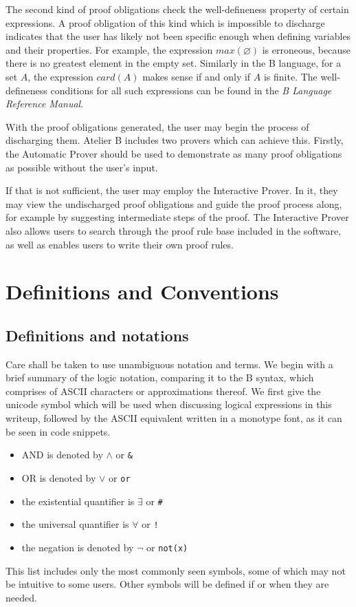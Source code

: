 \documentclass[11pt,journal]{IEEEtran}
\begin{document}
	The second kind of proof obligations check the well-defineness property of certain expressions. A proof obligation of this kind which is impossible to discharge indicates that the user has likely not been specific enough when defining variables and their properties. For example, the expression $max(\varnothing)$ is erroneous, because there is no greatest element in the empty set. Similarly in the B language, for a set $A$, the expression $card(A)$ makes sense if and only if $A$ is finite. The well-defineness conditions for all such expressions can be found in the \emph{B Language Reference Manual}\cite{b reference}.
	
	With the proof obligations generated, the user may begin the process of discharging them. Atelier B includes two provers which can achieve this. Firstly, the Automatic Prover should be used to demonstrate as many proof obligations as possible without the user's input.
	
	If that is not sufficient, the user may employ the Interactive Prover. In it, they may view the undischarged proof obligations and guide the proof process along, for example by suggesting intermediate steps of the proof. The Interactive Prover also allows users to search through the proof rule base included in the software, as well as enables users to write their own proof rules.
	
	
	
	\section{Definitions and Conventions}
	
	\subsection{Definitions and notations}
	Care shall be taken to use unambiguous notation and terms. We begin with a brief summary of the logic notation, comparing it to the B syntax, which comprises of ASCII characters or approximations thereof. We first give the unicode symbol which will be used when discussing logical expressions in this writeup, followed by the ASCII equivalent written in a monotype font, as it can be seen in code snippets. 
	\begin{itemize}
		\item AND is denoted by $\wedge$ or \texttt{\&}
		\item OR is denoted by $\vee$ or \texttt{or}
		\item the existential quantifier is $\exists$ or \texttt{\#}
		\item the universal quantifier is $\forall$ or \texttt{!}
		\item the negation is denoted by $\neg$ or \texttt{not(x)}
	\end{itemize}
	This list includes only the most commonly seen symbols, some of which may not be intuitive to some users. Other symbols will be defined if or when they are needed.
	
\end{document}
